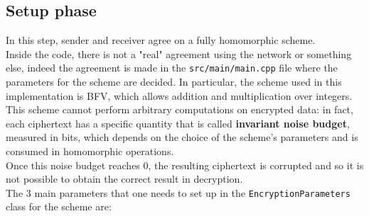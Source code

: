 \documentclass[10pt]{extarticle}
\begin{document}
\subsection{Setup phase}
In this step, sender and receiver agree on a fully homomorphic scheme.\\
Inside the code, there is not a "real" agreement using the network or something else, indeed the agreement is made in the \texttt{src/main/main.cpp} file where the parameters for the scheme are decided. In particular, the scheme used in this implementation is BFV, which allows addition and multiplication over integers.\\This scheme cannot perform arbitrary computations on encrypted data: in fact, each ciphertext has a specific quantity that is called \textbf{invariant noise budget}, measured in bits, which depends on the choice of the scheme's parameters and is consumed in homomorphic operations.\\Once this noise budget reaches 0, the resulting ciphertext is corrupted and so it is not possible to obtain the correct result in decryption.\\The 3 main parameters that one needs to set up in the \texttt{EncryptionParameters} class for the scheme are:
\end{document}
